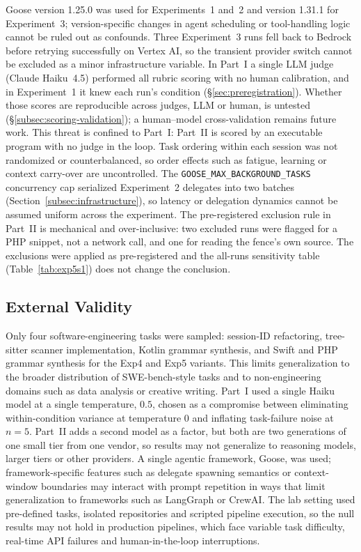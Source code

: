 \documentclass[11pt,a4paper]{article}
\begin{document}
Goose version 1.25.0 was used for Experiments~1 and~2 and version 1.31.1 for Experiment~3; version-specific changes in agent scheduling or tool-handling logic cannot be ruled out as confounds.
Three Experiment~3 runs fell back to Bedrock before retrying successfully on Vertex AI, so the transient provider switch cannot be excluded as a minor infrastructure variable.
In Part~I a single LLM judge (Claude Haiku~4.5) performed all rubric scoring with no human calibration, and in Experiment~1 it knew each run's condition (\S\ref{sec:preregistration}).
Whether those scores are reproducible across judges, LLM or human, is untested (\S\ref{subsec:scoring-validation}); a human--model cross-validation remains future work.
This threat is confined to Part~I: Part~II is scored by an executable program with no judge in the loop.
Task ordering within each session was not randomized or counterbalanced, so order effects such as fatigue, learning or context carry-over are uncontrolled.
The \texttt{GOOSE\_MAX\_BACKGROUND\_TASKS} concurrency cap serialized Experiment~2 delegates into two batches (Section~\ref{subsec:infrastructure}), so latency or delegation dynamics cannot be assumed uniform across the experiment.
The pre-registered exclusion rule in Part~II is mechanical and over-inclusive: two excluded runs were flagged for a PHP snippet, not a network call, and one for reading the fence's own source.
The exclusions were applied as pre-registered and the all-runs sensitivity table (Table~\ref{tab:exp5s1}) does not change the conclusion.

\subsection{External Validity}

Only four software-engineering tasks were sampled: session-ID refactoring, tree-sitter scanner implementation, Kotlin grammar synthesis, and Swift and PHP grammar synthesis for the Exp4 and Exp5 variants.
This limits generalization to the broader distribution of SWE-bench-style tasks and to non-engineering domains such as data analysis or creative writing.
Part~I used a single Haiku model at a single temperature, $0.5$, chosen as a compromise between eliminating within-condition variance at temperature 0 and inflating task-failure noise at $n{=}5$.
Part~II adds a second model as a factor, but both are two generations of one small tier from one vendor, so results may not generalize to reasoning models, larger tiers or other providers.
A single agentic framework, Goose, was used; framework-specific features such as delegate spawning semantics or context-window boundaries may interact with prompt repetition in ways that limit generalization to frameworks such as LangGraph or CrewAI.
The lab setting used pre-defined tasks, isolated repositories and scripted pipeline execution, so the null results may not hold in production pipelines, which face variable task difficulty, real-time API failures and human-in-the-loop interruptions.
\end{document}
